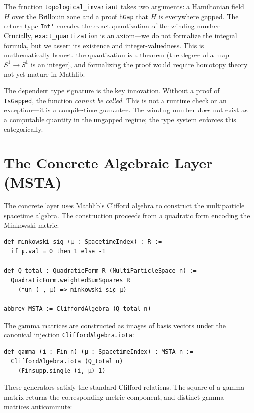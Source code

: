 \documentclass[11pt,a4paper]{article}
\newcommand{\lean}[1]{\lstinline[language=Lean4]{#1}}
\begin{document}
The function \lean{topological_invariant} takes two arguments: a Hamiltonian field $H$ over the Brillouin zone and a proof \lean{hGap} that $H$ is everywhere gapped. The return type \lean{Int'} encodes the exact quantization of the winding number. Crucially, \lean{exact_quantization} is an axiom---we do not formalize the integral formula, but we assert its existence and integer-valuedness. This is mathematically honest: the quantization is a theorem (the degree of a map $S^1 \to S^1$ is an integer), and formalizing the proof would require homotopy theory not yet mature in Mathlib.

The dependent type signature is the key innovation. Without a proof of \lean{IsGapped}, the function \emph{cannot be called}. This is not a runtime check or an exception---it is a compile-time guarantee. The winding number does not exist as a computable quantity in the ungapped regime; the type system enforces this categorically.

\section{The Concrete Algebraic Layer (MSTA)}
\label{sec:concrete}

The concrete layer uses Mathlib's Clifford algebra to construct the multiparticle spacetime algebra. The construction proceeds from a quadratic form encoding the Minkowski metric:

\begin{lstlisting}
def minkowski_sig (μ : SpacetimeIndex) : R :=
  if μ.val = 0 then 1 else -1

def Q_total : QuadraticForm R (MultiParticleSpace n) :=
  QuadraticForm.weightedSumSquares R
    (fun (_, μ) => minkowski_sig μ)

abbrev MSTA := CliffordAlgebra (Q_total n)
\end{lstlisting}

The gamma matrices are constructed as images of basis vectors under the canonical injection \lean{CliffordAlgebra.iota}:

\begin{lstlisting}
def gamma (i : Fin n) (μ : SpacetimeIndex) : MSTA n :=
  CliffordAlgebra.iota (Q_total n)
    (Finsupp.single (i, μ) 1)
\end{lstlisting}

These generators satisfy the standard Clifford relations. The square of a gamma matrix returns the corresponding metric component, and distinct gamma matrices anticommute:
\end{document}
